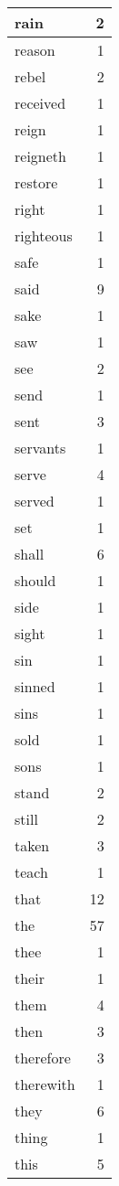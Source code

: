 \begin{center}
\begin{longtable}{l|r}
rain & 2 \\ \hline
reason & 1 \\ \hline
rebel & 2 \\ \hline
received & 1 \\ \hline
reign & 1 \\ \hline
reigneth & 1 \\ \hline
restore & 1 \\ \hline
right & 1 \\ \hline
righteous & 1 \\ \hline
safe & 1 \\ \hline
said & 9 \\ \hline
sake & 1 \\ \hline
saw & 1 \\ \hline
see & 2 \\ \hline
send & 1 \\ \hline
sent & 3 \\ \hline
servants & 1 \\ \hline
serve & 4 \\ \hline
served & 1 \\ \hline
set & 1 \\ \hline
shall & 6 \\ \hline
should & 1 \\ \hline
side & 1 \\ \hline
sight & 1 \\ \hline
sin & 1 \\ \hline
sinned & 1 \\ \hline
sins & 1 \\ \hline
sold & 1 \\ \hline
sons & 1 \\ \hline
stand & 2 \\ \hline
still & 2 \\ \hline
taken & 3 \\ \hline
teach & 1 \\ \hline
that & 12 \\ \hline
the & 57 \\ \hline
thee & 1 \\ \hline
their & 1 \\ \hline
them & 4 \\ \hline
then & 3 \\ \hline
therefore & 3 \\ \hline
therewith & 1 \\ \hline
they & 6 \\ \hline
thing & 1 \\ \hline
this & 5 \\ \hline

\end{longtable}
\end{center}
